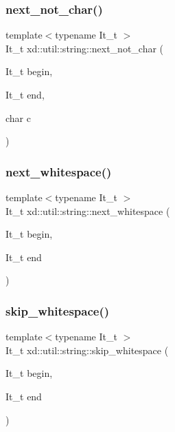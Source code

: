 \subsubsection{\texorpdfstring{next\+\_\+not\+\_\+char()}{next\_not\_char()}}
{\footnotesize\ttfamily template$<$typename It\+\_\+t $>$ \\
It\+\_\+t xd\+::util\+::string\+::next\+\_\+not\+\_\+char (\begin{DoxyParamCaption}\item[{It\+\_\+t}]{begin,  }\item[{It\+\_\+t}]{end,  }\item[{char}]{c }\end{DoxyParamCaption})}

\mbox{\label{namespacexd_1_1util_1_1string_a9872a2bbf2d81feb9c504f0f62b4e080}} 
\subsubsection{\texorpdfstring{next\+\_\+whitespace()}{next\_whitespace()}}
{\footnotesize\ttfamily template$<$typename It\+\_\+t $>$ \\
It\+\_\+t xd\+::util\+::string\+::next\+\_\+whitespace (\begin{DoxyParamCaption}\item[{It\+\_\+t}]{begin,  }\item[{It\+\_\+t}]{end }\end{DoxyParamCaption})}

\mbox{\label{namespacexd_1_1util_1_1string_a9f49114d05158d1b0b60d0ad2e471b7e}} 
\subsubsection{\texorpdfstring{skip\+\_\+whitespace()}{skip\_whitespace()}}
{\footnotesize\ttfamily template$<$typename It\+\_\+t $>$ \\
It\+\_\+t xd\+::util\+::string\+::skip\+\_\+whitespace (\begin{DoxyParamCaption}\item[{It\+\_\+t}]{begin,  }\item[{It\+\_\+t}]{end }\end{DoxyParamCaption})}


